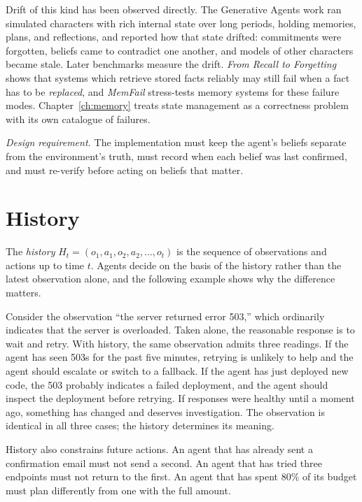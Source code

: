 \documentclass[11pt]{book}
\begin{document}
Drift of this kind has been observed directly. The Generative Agents work \cite{park2023generative} ran simulated characters with rich internal state over long periods, holding memories, plans, and reflections, and reported how that state drifted: commitments were forgotten, beliefs came to contradict one another, and models of other characters became stale. Later benchmarks measure the drift. \emph{From Recall to Forgetting} \cite{recallforget2026} shows that systems which retrieve stored facts reliably may still fail when a fact has to be \textit{replaced}, and \emph{MemFail} \cite{memfail2026} stress-tests memory systems for these failure modes. Chapter~\ref{ch:memory} treats state management as a correctness problem with its own catalogue of failures.

\textit{Design requirement.} The implementation must keep the agent's beliefs separate from the environment's truth, must record when each belief was last confirmed, and must re-verify before acting on beliefs that matter.

\section{History}

The \emph{history} $H_t = (o_1, a_1, o_2, a_2, \ldots, o_t)$ is the sequence of observations and actions up to time $t$. Agents decide on the basis of the history rather than the latest observation alone, and the following example shows why the difference matters.

Consider the observation ``the server returned error 503,'' which ordinarily indicates that the server is overloaded. Taken alone, the reasonable response is to wait and retry. With history, the same observation admits three readings. If the agent has seen 503s for the past five minutes, retrying is unlikely to help and the agent should escalate or switch to a fallback. If the agent has just deployed new code, the 503 probably indicates a failed deployment, and the agent should inspect the deployment before retrying. If responses were healthy until a moment ago, something has changed and deserves investigation. The observation is identical in all three cases; the history determines its meaning.

History also constrains future actions. An agent that has already sent a confirmation email must not send a second. An agent that has tried three endpoints must not return to the first. An agent that has spent 80\% of its budget must plan differently from one with the full amount.
\end{document}
